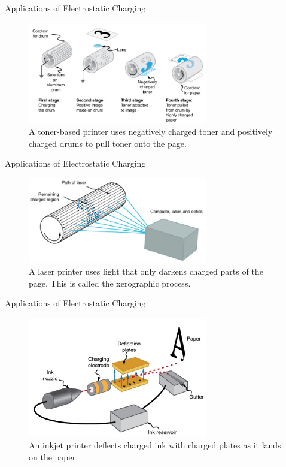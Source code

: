 \documentclass{beamer}
\begin{document}
\begin{frame}{Applications of Electrostatic Charging}
\begin{figure}
\centering
\includegraphics[width=0.7\textwidth]{figures/app1.png}
\caption{\label{fig:app1} A toner-based printer uses negatively charged toner and positively charged drums to pull toner onto the page.}
\end{figure}
\end{frame}

\begin{frame}{Applications of Electrostatic Charging}
\begin{figure}
\centering
\includegraphics[width=0.7\textwidth]{figures/app2.png}
\caption{\label{fig:app2} A laser printer uses light that only darkens charged parts of the page.  This is called the xerographic process.}
\end{figure}
\end{frame}

\begin{frame}{Applications of Electrostatic Charging}
\begin{figure}
\centering
\includegraphics[width=0.7\textwidth]{figures/app3.png}
\caption{\label{fig:app3} An inkjet printer deflects charged ink with charged plates as it lands on the paper.}
\end{figure}
\end{frame}
\end{document}
